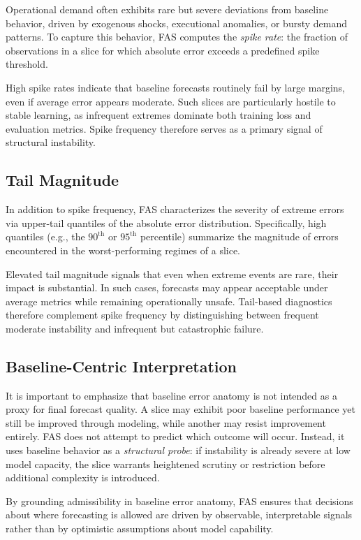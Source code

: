Operational demand often exhibits rare but severe deviations from baseline
behavior, driven by exogenous shocks, executional anomalies, or bursty demand
patterns. To capture this behavior, FAS computes the \emph{spike rate}: the
fraction of observations in a slice for which absolute error exceeds a
predefined spike threshold.

High spike rates indicate that baseline forecasts routinely fail by large
margins, even if average error appears moderate. Such slices are particularly
hostile to stable learning, as infrequent extremes dominate both training loss
and evaluation metrics. Spike frequency therefore serves as a primary signal of
structural instability.

\subsection{Tail Magnitude}

In addition to spike frequency, FAS characterizes the severity of extreme errors
via upper-tail quantiles of the absolute error distribution. Specifically, high
quantiles (e.g., the $90^{\text{th}}$ or $95^{\text{th}}$ percentile) summarize
the magnitude of errors encountered in the worst-performing regimes of a slice.

Elevated tail magnitude signals that even when extreme events are rare, their
impact is substantial. In such cases, forecasts may appear acceptable under
average metrics while remaining operationally unsafe. Tail-based diagnostics
therefore complement spike frequency by distinguishing between frequent moderate
instability and infrequent but catastrophic failure.

\subsection{Baseline-Centric Interpretation}

It is important to emphasize that baseline error anatomy is not intended as a
proxy for final forecast quality. A slice may exhibit poor baseline performance
yet still be improved through modeling, while another may resist improvement
entirely. FAS does not attempt to predict which outcome will occur. Instead, it
uses baseline behavior as a \emph{structural probe}: if instability is already
severe at low model capacity, the slice warrants heightened scrutiny or
restriction before additional complexity is introduced.

By grounding admissibility in baseline error anatomy, FAS ensures that decisions
about where forecasting is allowed are driven by observable, interpretable
signals rather than by optimistic assumptions about model capability.
